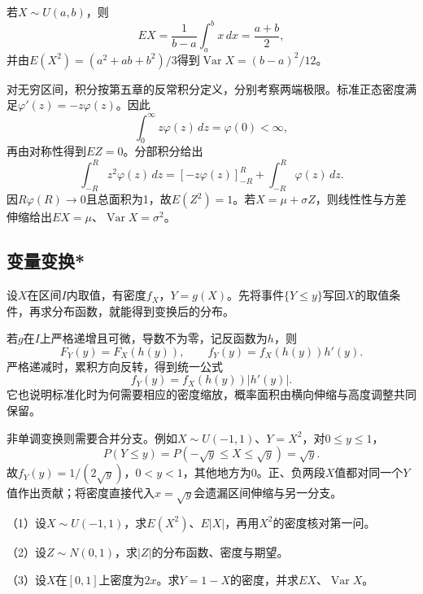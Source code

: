 若\(X\sim U(a,b)\)，则
\[
 EX=\frac1{b-a}\int_a^b x\,dx=\frac{a+b}2,
\]
并由\(E(X^2)=(a^2+ab+b^2)/3\)得到\(\operatorname{Var}X=(b-a)^2/12\)。

对无穷区间，积分按第五章的反常积分定义，分别考察两端极限。标准正态密度满足\(\varphi'(z)=-z\varphi(z)\)。因此
\[
 \int_0^\infty z\varphi(z)\,dz=\varphi(0)<\infty,
\]
再由对称性得到\(EZ=0\)。分部积分给出
\[
 \int_{-R}^R z^2\varphi(z)\,dz
 =[-z\varphi(z)]_{-R}^R+\int_{-R}^R\varphi(z)\,dz.
\]
因\(R\varphi(R)\to0\)且总面积为1，故\(E(Z^2)=1\)。若\(X=\mu+\sigma Z\)，则线性性与方差伸缩给出\(EX=\mu\)、\(\operatorname{Var}X=\sigma^2\)。

\subsection{变量变换*}

设\(X\)在区间\(I\)内取值，有密度\(f_X\)，\(Y=g(X)\)。先将事件\(\{Y\le y\}\)写回\(X\)的取值条件，再求分布函数，就能得到变换后的分布。

若\(g\)在\(I\)上严格递增且可微，导数不为零，记反函数为\(h\)，则
\[
 F_Y(y)=F_X(h(y)),\qquad f_Y(y)=f_X(h(y))h'(y).
\]
严格递减时，累积方向反转，得到统一公式
\begin{equation}\label{eq:prob-density-transform}
 f_Y(y)=f_X(h(y))|h'(y)|.
\end{equation}
它也说明标准化时为何需要相应的密度缩放，概率面积由横向伸缩与高度调整共同保留。

非单调变换则需要合并分支。例如\(X\sim U(-1,1)\)、\(Y=X^2\)，对\(0\le y\le1\)，
\[
 P(Y\le y)=P(-\sqrt y\le X\le\sqrt y)=\sqrt y.
\]
故\(f_Y(y)=1/(2\sqrt y)\)，\(0<y<1\)，其他地方为0。正、负两段\(X\)值都对同一个\(Y\)值作出贡献；将密度直接代入\(x=\sqrt y\)会遗漏区间伸缩与另一分支。

\begin{exercise}
\mbox{}\par\nobreak

（1）设\(X\sim U(-1,1)\)，求\(E(X^2)\)、\(E|X|\)，再用\(X^2\)的密度核对第一问。

（2）设\(Z\sim N(0,1)\)，求\(|Z|\)的分布函数、密度与期望。

（3）设\(X\)在\([0,1]\)上密度为\(2x\)。求\(Y=1-X\)的密度，并求\(EX\)、\(\operatorname{Var}X\)。
\end{exercise}
